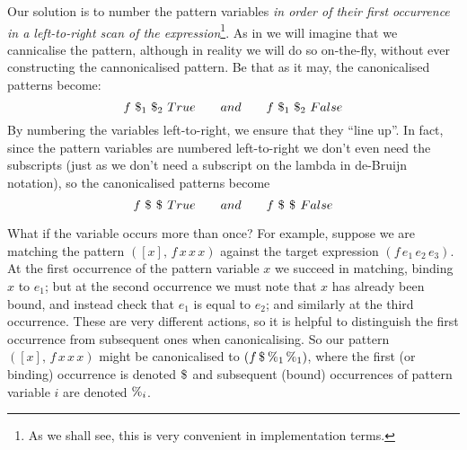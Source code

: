 \documentclass[acmsmall]{acmart}
\theoremstyle{theorem}
\theoremstyle{definition}
\theoremstyle{remark}
\begin{document}
Our solution is to number the pattern variables \emph{in order of their
first occurrence in a left-to-right scan of the expression}\footnote{As we shall
  see, this is very convenient in implementation terms.}.
As in  we will imagine that we cannicalise the pattern, although
in reality we will do so on-the-fly, without ever constructing the cannonicalised pattern.
Be that as it may, the canonicalised patterns become:
$$
   f~\$_{1}~\$_{2}~True      \qquad and \qquad  f~\$_{1}~\$_{2}~False
$$
By numbering the variables left-to-right, we ensure that they ``line up''.
In fact, since the pattern variables are numbered left-to-right we don't even
need the subscripts (just as we don't need a subscript on the lambda in
de-Bruijn notation), so the canonicalised patterns become
$$
   f~\$_{}~\$_{}~True      \qquad and \qquad  f~\$_{}~\$_{}~False
$$


What if the variable occurs more than once? For example, suppose we are matching
the pattern $([x],\, f\, x\,x\,x)$ against the target expression
$(f\,e_1\,e_2\,e_3)$.  At the first occurrence of the pattern variable $x$
we succeed in matching, binding $x$ to $e_1$; but at the second
occurrence we must note that $x$ has already been bound, and instead
check that $e_1$ is equal to $e_2$; and similarly at the third occurrence.
These are very different actions,
so it is helpful to distinguish the first occurrence from subsequent
ones when canonicalising.  So our pattern $([x],\, f\, x\,x\,x)$ might
be canonicalised to $(f\,\$_{}\,\%_{1}\,\%_{1})$, where the first (or binding) occurrence
is denoted $\$_{}$ and subsequent (bound) occurrences of pattern variable $i$ are denoted $\%_{i}$.
\end{document}
